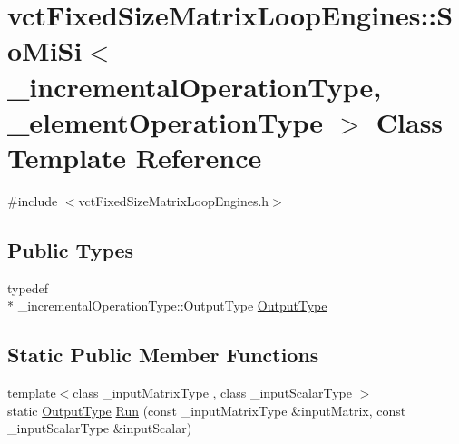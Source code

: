 \hypertarget{classvct_fixed_size_matrix_loop_engines_1_1_so_mi_si}{\section{vct\-Fixed\-Size\-Matrix\-Loop\-Engines\-:\-:So\-Mi\-Si$<$ \-\_\-incremental\-Operation\-Type, \-\_\-element\-Operation\-Type $>$ Class Template Reference}
\label{classvct_fixed_size_matrix_loop_engines_1_1_so_mi_si}
}


{\ttfamily \#include $<$vct\-Fixed\-Size\-Matrix\-Loop\-Engines.\-h$>$}

\subsection*{Public Types}
\begin{DoxyCompactItemize}
\item 
typedef \\*
\-\_\-incremental\-Operation\-Type\-::\-Output\-Type \hyperlink{classvct_fixed_size_matrix_loop_engines_1_1_so_mi_si_ac5487cd61e043f96d0d4a5310c2b04f4}{Output\-Type}
\end{DoxyCompactItemize}
\subsection*{Static Public Member Functions}
\begin{DoxyCompactItemize}
\item 
{\footnotesize template$<$class \-\_\-input\-Matrix\-Type , class \-\_\-input\-Scalar\-Type $>$ }\\static \hyperlink{classvct_fixed_size_matrix_loop_engines_1_1_so_mi_si_ac5487cd61e043f96d0d4a5310c2b04f4}{Output\-Type} \hyperlink{classvct_fixed_size_matrix_loop_engines_1_1_so_mi_si_a9ea8058fce286e2263e3df5988a85efb}{Run} (const \-\_\-input\-Matrix\-Type \&input\-Matrix, const \-\_\-input\-Scalar\-Type \&input\-Scalar)
\end{DoxyCompactItemize}


